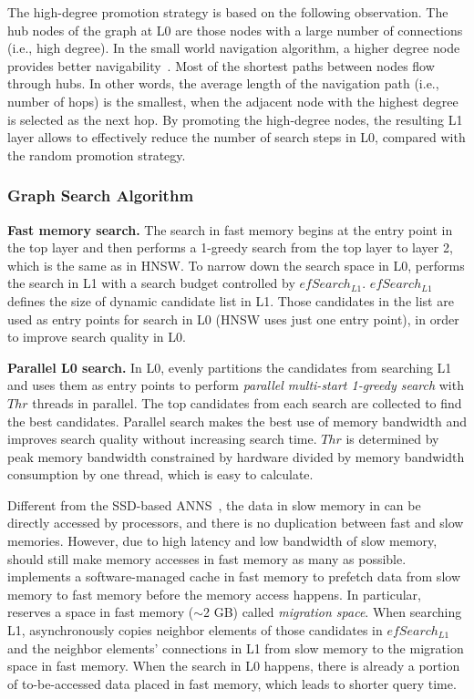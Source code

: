 The high-degree promotion strategy is based on the following observation. The hub nodes of the graph at L0 are those nodes with a large number of connections (i.e., high degree). In the small world navigation algorithm, a higher degree node provides better navigability~\cite{swg}. Most of the shortest paths between nodes flow through hubs. In other words, the average length of the navigation path (i.e., number of hops) is the smallest, when the adjacent node with the highest degree is selected as the next hop. By promoting the high-degree nodes, the resulting L1 layer allows \algoname to effectively reduce the number of search steps in L0, compared with the random promotion strategy.

\subsubsection{\name Graph Search Algorithm}
\label{minjia_sec:searching}

\textbf{Fast memory search.} The search in fast memory begins at the entry point in the top layer and then performs a 1-greedy search from the top layer to layer 2, which is the same as in HNSW. To narrow down the search space in L0, \name performs the search in L1 with a search budget controlled by $efSearch_{L1}$. $efSearch_{L1}$ defines the size of dynamic candidate list in L1. Those candidates in the list are used as entry points for search in L0 (HNSW uses just one entry point), in order to improve search quality in L0. 

\textbf{Parallel L0 search.} In L0, \name evenly partitions the candidates from searching L1 and uses them as entry points to perform \emph{parallel multi-start 1-greedy search} with  $Thr$ threads in parallel. The top candidates from each search are collected to find the best candidates. Parallel search makes the best use of memory bandwidth and improves search quality without increasing search time. $Thr$ is determined by peak memory bandwidth constrained by hardware divided by memory bandwidth consumption by one thread, which is easy to calculate. 

Different from the SSD-based ANNS~\cite{diskann,grip}, the data in slow memory in \name can be directly accessed by processors, and there is no duplication between fast and slow memories. However, due to high latency and low bandwidth of slow memory, \name should still make memory accesses in fast memory as many as possible. \name implements a software-managed cache in fast memory to prefetch data from slow memory to fast memory before the memory access happens. In particular, \name reserves a space in fast memory ($\sim$2 GB) called \textit{migration space}. When searching L1, \name asynchronously copies neighbor elements of those candidates in $efSearch_{L1}$ and the neighbor elements' connections in L1 from slow memory to the migration space in fast memory. When the search in L0 happens, there is already a portion of to-be-accessed data placed in fast memory, which leads to shorter query time.
